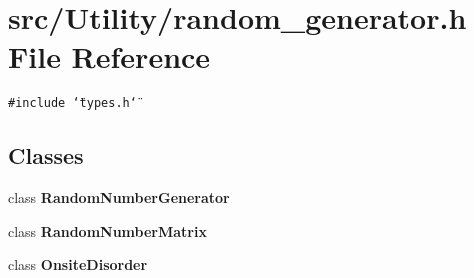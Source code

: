 \section{src/Utility/random\_\-generator.h File Reference}
\label{random__generator_8h}
{\tt \#include \char`\"{}types.h\char`\"{}}\par
\subsection*{Classes}
\begin{CompactItemize}
\item 
class \bf{Random\-Number\-Generator}
\item 
class \bf{Random\-Number\-Matrix}
\item 
class \bf{Onsite\-Disorder}
\end{CompactItemize}
